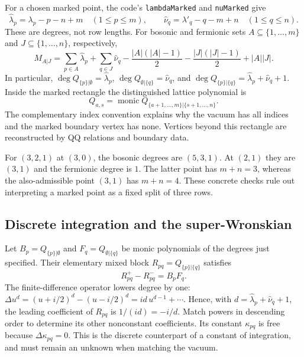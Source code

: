 \documentclass[11pt]{article}
\newcommand{\file}[1]{\texttt{#1}}
\begin{document}
For a chosen marked point, the code's \file{lambdaMarked} and
\file{nuMarked} give
\begin{equation}
 \label{eq:shifted-weights}
 \widehat\lambda_p=\lambda_p-p-n+m\quad(1\le p\le m),\qquad
 \widehat\nu_q=\lambda'_q-q-m+n\quad(1\le q\le n).
\end{equation}
These are degrees, not row lengths. For bosonic and fermionic sets
$A\subseteq\{1,\ldots,m\}$ and $J\subseteq\{1,\ldots,n\}$, respectively,
\begin{equation}
 \label{eq:mixed-degree}
 M_{A|J}=\sum_{p\in A}\widehat\lambda_p+
 \sum_{q\in J}\widehat\nu_q
 -\frac{|A|(|A|-1)}2-\frac{|J|(|J|-1)}2+|A||J|.
\end{equation}
In particular, $\deg Q_{\{p\}|\emptyset}=\widehat\lambda_p$,
$\deg Q_{\emptyset|\{q\}}=\widehat\nu_q$, and
$\deg Q_{\{p\}|\{q\}}=\widehat\lambda_p+\widehat\nu_q+1$.
Inside the marked rectangle the distinguished lattice polynomial is
\begin{equation}
 \label{eq:lattice-index-map}
 Q_{a,s}=\operatorname{monic}
 Q_{\{a+1,\ldots,m\}|\{s+1,\ldots,n\}}.
\end{equation}
The complementary index convention explains why the vacuum has all
indices and the marked boundary vertex has none. Vertices beyond this
rectangle are reconstructed by QQ relations and boundary data.

For $(3,2,1)$ at $(3,0)$, the bosonic degrees are $(5,3,1)$.
At $(2,1)$ they are $(3,1)$ and the fermionic degree is $1$.
The latter point has $m+n=3$, whereas the also-admissible point $(3,1)$
has $m+n=4$. These concrete checks rule out interpreting a marked point
as a fixed split of three rows.

\subsection{Discrete integration and the super-Wronskian}

Let $B_p=Q_{\{p\}|\emptyset}$ and $F_q=Q_{\emptyset|\{q\}}$ be monic
polynomials of the degrees just specified. Their elementary mixed block
$R_{pq}=Q_{\{p\}|\{q\}}$ satisfies
\begin{equation}
 \label{eq:mixed-antiderivative}
 R_{pq}^+-R_{pq}^-=B_pF_q.
\end{equation}
The finite-difference operator lowers degree by one:
$\Delta u^d=(u+i/2)^d-(u-i/2)^d=id\,u^{d-1}+\cdots$.
Hence, with $d=\widehat\lambda_p+\widehat\nu_q+1$, the leading
coefficient of $R_{pq}$ is $1/(id)=-i/d$. Match powers in descending
order to determine its other nonconstant coefficients. Its constant
$\kappa_{pq}$ is free because $\Delta\kappa_{pq}=0$. This is the
discrete counterpart of a constant of integration, and must remain an
unknown when matching the vacuum.
\end{document}
